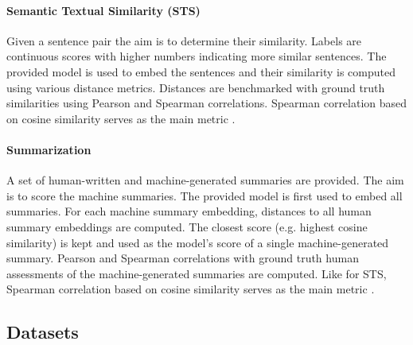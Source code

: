 \documentclass[11pt]{article}
\begin{document}
\paragraph{Semantic Textual Similarity (STS)} Given a sentence pair the aim is to determine their similarity. Labels are continuous scores with higher numbers indicating more similar sentences. The provided model is used to embed the sentences and their similarity is computed using various distance metrics. Distances are benchmarked with ground truth similarities using Pearson and Spearman correlations. Spearman correlation based on cosine similarity serves as the main metric \cite{reimers2016task}.

\paragraph{Summarization} A set of human-written and machine-generated summaries are provided. The aim is to score the machine summaries. The provided model is first used to embed all summaries. For each machine summary embedding, distances to all human summary embeddings are computed. The closest score (e.g. highest cosine similarity) is kept and used as the model's score of a single machine-generated summary. Pearson and Spearman correlations with ground truth human assessments of the machine-generated summaries are computed. Like for STS, Spearman correlation based on cosine similarity serves as the main metric \cite{reimers2016task}.

\subsection{Datasets}
\label{sec:datasets}
\end{document}
